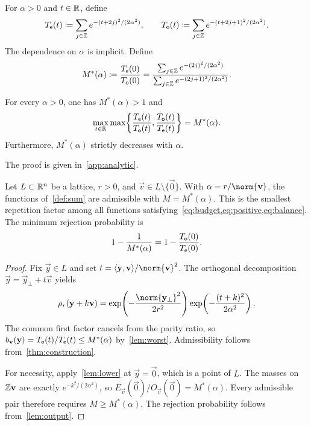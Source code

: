 \begin{definition}
\label{def:scalar}
For $\alpha>0$ and $t\in\mathbb{R}$, define
\[
 T_{\mathsf e}(t)\coloneqq\sum_{j\in\mathbb{Z}}e^{-(t+2j)^2/(2\alpha^2)},
 \qquad
 T_{\mathsf o}(t)\coloneqq\sum_{j\in\mathbb{Z}}e^{-(t+2j+1)^2/(2\alpha^2)}.
\]
The dependence on $\alpha$ is implicit. Define
\begin{equation}
\label{eq:optimum}
 M^*(\alpha)\coloneqq\frac{T_{\mathsf e}(0)}{T_{\mathsf o}(0)}
 =\frac{\sum_{j\in\mathbb{Z}}e^{-(2j)^2/(2\alpha^2)}}{\sum_{j\in\mathbb{Z}}e^{-(2j+1)^2/(2\alpha^2)}}.
\end{equation}
\end{definition}

\begin{lemma}
\label{lem:worst}
For every $\alpha>0$, one has $M^*(\alpha)>1$ and
\[
 \max_{t\in\mathbb{R}}\max\!\left\{\frac{T_{\mathsf e}(t)}{T_{\mathsf o}(t)},\frac{T_{\mathsf o}(t)}{T_{\mathsf e}(t)}\right\}=M^*(\alpha).
\]
Furthermore, $M^*(\alpha)$ strictly decreases with $\alpha$.
\end{lemma}
The proof is given in~\cref{app:analytic}.

\begin{theorem}
\label{thm:optimal}
Let $L\subset\mathbb{R}^n$ be a lattice, $r>0$, and $\vec v\in L\setminus\{\vec0\}$. With $\alpha=r/\norm{\vec v}$, the functions of~\cref{def:sum} are admissible with $M=M^*(\alpha)$. This is the smallest repetition factor among all functions satisfying~\cref{eq:budget,eq:positive,eq:balance}. The minimum rejection probability is
\[
 1-\frac1{M^*(\alpha)}=1-\frac{T_{\mathsf o}(0)}{T_{\mathsf e}(0)}.
\]
\end{theorem}
\begin{proof}
Fix $\vec y\in L$ and set $t=\inner{\vec y}{\vec v}/\norm{\vec v}^2$. The orthogonal decomposition $\vec y=\vec y_{\perp}+t\vec v$ yields
\[
 \rho_r(\vec y+k\vec v)=\exp\!\left(-\frac{\norm{\vec y_{\perp}}^2}{2r^2}\right)
 \exp\!\left(-\frac{(t+k)^2}{2\alpha^2}\right).
\]
The common first factor cancels from the parity ratio, so $b_{\mathbf{v}}(\mathbf{y})=T_{\mathsf o}(t)/T_{\mathsf e}(t)\le M^*(\alpha)$ by~\cref{lem:worst}. Admissibility follows from~\cref{thm:construction}.

For necessity, apply~\cref{lem:lower} at $\vec y=\vec0$, which is a point of $L$. The masses on $\mathbb{Z}\mathbf{v}$ are exactly $e^{-k^2/(2\alpha^2)}$, so $E_{\vec v}(\vec0)/O_{\vec v}(\vec0)=M^*(\alpha)$. Every admissible pair therefore requires $M\ge M^*(\alpha)$. The rejection probability follows from~\cref{lem:output}.
\end{proof}

